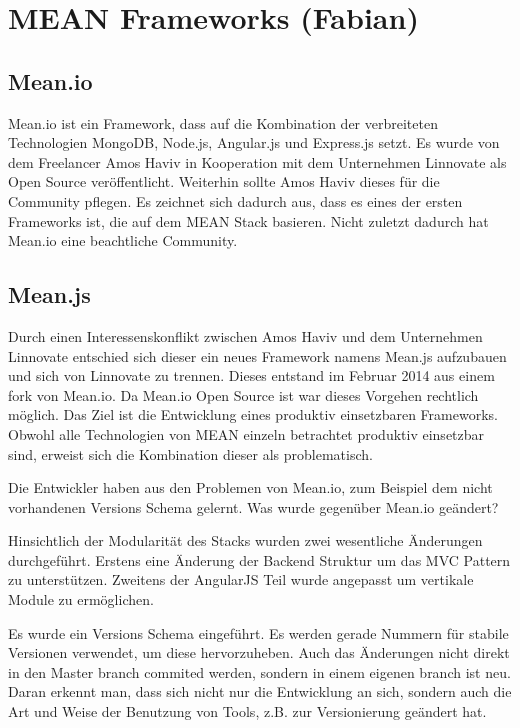 \chapter{MEAN Frameworks (Fabian)}\label{mean-frameworks-fabian}

\section{Mean.io}\label{mean.io}

Mean.io ist ein Framework, dass auf die Kombination der verbreiteten
Technologien MongoDB, Node.js, Angular.js und Express.js setzt. Es wurde
von dem Freelancer Amos Haviv in Kooperation mit dem Unternehmen
Linnovate als Open Source veröffentlicht. Weiterhin sollte Amos Haviv
dieses für die Community pflegen. Es zeichnet sich dadurch aus, dass es
eines der ersten Frameworks ist, die auf dem MEAN Stack basieren. Nicht
zuletzt dadurch hat Mean.io eine beachtliche Community.

\section{Mean.js}\label{mean.js}

Durch einen Interessenskonflikt zwischen Amos Haviv und dem Unternehmen
Linnovate entschied sich dieser ein neues Framework namens Mean.js
aufzubauen und sich von Linnovate zu trennen. Dieses entstand im Februar
2014 aus einem fork von Mean.io. Da Mean.io Open Source ist war dieses
Vorgehen rechtlich möglich. Das Ziel ist die Entwicklung eines produktiv
einsetzbaren Frameworks. Obwohl alle Technologien von MEAN einzeln
betrachtet produktiv einsetzbar sind, erweist sich die Kombination
dieser als problematisch.

Die Entwickler haben aus den Problemen von Mean.io, zum Beispiel dem
nicht vorhandenen Versions Schema gelernt. Was wurde gegenüber Mean.io
geändert?

Hinsichtlich der Modularität des Stacks wurden zwei wesentliche Änderungen durchgeführt. Erstens eine Änderung der Backend Struktur um das MVC Pattern zu unterstützen. Zweitens der AngularJS Teil wurde angepasst um vertikale Module zu ermöglichen.

Es wurde ein Versions Schema eingeführt. Es werden gerade Nummern für stabile Versionen verwendet, um diese hervorzuheben. Auch das Änderungen nicht direkt in den Master branch commited werden, sondern in einem eigenen branch ist neu. Daran erkennt man, dass sich nicht nur die Entwicklung an sich, sondern auch die Art und Weise der Benutzung von Tools, z.B. zur Versionierung geändert hat.

